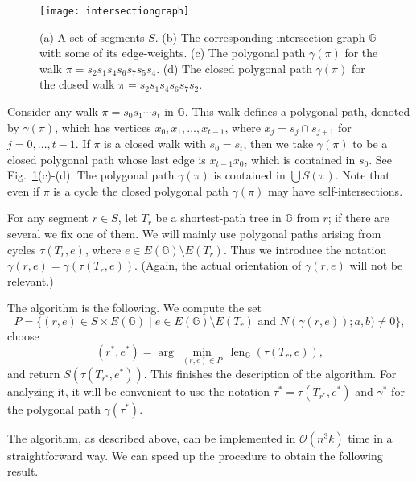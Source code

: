 \documentclass[11pt,a4paper]{article}
\def\I{\ensuremath{\mathbb{G}}}
\def\cycle{\ensuremath{\tau}}
\DeclareMathOperator{\lengthBIS}{len}
\newcommand\length{\lengthBIS_{\I}}
\begin{document}
\begin{figure}
\centering
	\texttt{[image: intersectiongraph]}
	\caption{(a) A set of segments $S$. 
			(b) The corresponding intersection graph $\I$ with some of its edge-weights.
			(c) The polygonal path $\gamma(\pi)$ for the walk $\pi=s_2 s_1 s_4 s_6 s_7 s_5 s_4$.
			(d) The closed polygonal path $\gamma(\pi)$ for the closed walk $\pi=s_2 s_1 s_4 s_6 s_7 s_2$.}
	\label{fig:intersectiongraph}
\end{figure}	

Consider any walk $\pi=s_0 s_1\cdots s_t$ in $\I$.
This walk defines a polygonal path, denoted by $\gamma(\pi)$, 
which has vertices $x_0,x_1,\dots ,x_{t-1}$,
where $x_j=s_j\cap s_{j+1}$ for $j=0,\dots,t-1$. 
If $\pi$ is a closed walk with $s_0=s_t$, then we take $\gamma(\pi)$ to be 
a closed polygonal path whose last edge is $x_{t-1}x_0$, which is contained in $s_0$.
See Fig.~\ref{fig:intersectiongraph}(c)-(d). 
The polygonal path $\gamma(\pi)$ is contained in $\bigcup S(\pi)$.
Note that even if $\pi$ is a cycle
the closed polygonal path $\gamma(\pi)$ may have self-intersections.

For any segment $r\in S$, let $T_r$ be a shortest-path tree in $\I$ from $r$;
if there are several we fix one of them.
We will mainly use polygonal paths arising from cycles $\cycle(T_r,e)$,
where $e\in E(\I)\setminus E(T_r)$.
Thus we introduce the notation $\gamma(r,e)=\gamma (\cycle(T_r,e))$.
(Again, the actual orientation of $\gamma(r,e)$ will not be relevant.)

The algorithm is the following. We
compute the set
\[
	P=\{ (r,e)\in S\times E(\I) \mid \mbox{$e\in E(\I)\setminus E(T_r)$ and 
										$N(\gamma(r,e));a,b)\not = 0$}\},
\]
choose
\[
	(r^*,e^*)= \arg~ \min_{(r,e)\in P}~ \length(\cycle(T_r,e)),
\]
and return $S(\cycle(T_{r^*},e^*))$.
This finishes the description of the algorithm.
For analyzing it, it will be convenient to use the notation
$\tau^*=\cycle(T_{r^*},e^*)$ and $\gamma^*$ for the polygonal path $\gamma(\tau^*)$. 

The algorithm, as described above,
can be implemented in $\mathcal{O}(n^3k)$ time in a straightforward way.
We can speed up the procedure to obtain the following result.
\end{document}
